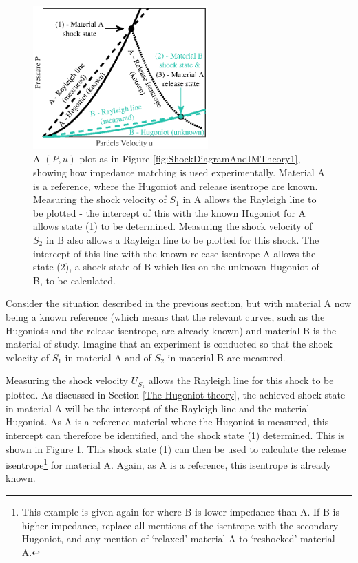 \begin{figure}
\centering
\includegraphics[width=0.6\textwidth]{figures/Theory/MatlabIM2.eps}%
\caption{\label{fig:IMTheory2} A $(P,u)$ plot as in Figure \ref{fig:ShockDiagramAndIMTheory1}, showing how impedance matching is used experimentally. Material A is a reference, where the Hugoniot and release isentrope are known. Measuring the shock velocity of $S_1$ in A allows the Rayleigh line to be plotted - the intercept of this with the known Hugoniot for A allows state (1) to be determined. Measuring the shock velocity of $S_2$ in B also allows a Rayleigh line to be plotted for this shock. The intercept of this line with the known release isentrope A allows the state (2), a shock state of B which lies on the unknown Hugoniot of B, to be calculated.}
\end{figure}

Consider the situation described in the previous section, but with material A now being a known reference (which means that the relevant curves, such as the Hugoniots and the release isentrope, are already known) and material B is the material of study. Imagine that an experiment is conducted so that the shock velocity of $S_1$ in material A and of  $S_2$ in material B are measured.

Measuring the shock velocity $U_{S_1}$ allows the Rayleigh line for this shock to be plotted. As discussed in Section \ref{The Hugoniot theory}, the achieved shock state in material A will be the intercept of the Rayleigh line and the material Hugoniot. As A is a reference material where the Hugoniot is measured, this intercept can therefore be identified, and the shock state (1) determined. This is shown in Figure \ref{fig:IMTheory2}. This shock state (1) can then be used to calculate the release isentrope\footnote{This example is given again for where B is lower impedance than A. If B is higher impedance, replace all mentions of the isentrope with the secondary Hugoniot, and any mention of `relaxed' material A to `reshocked' material A.} for material A. Again, as A is a reference, this isentrope is already known.

